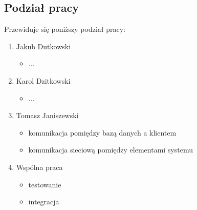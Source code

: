 \documentclass[paper=a4, fontsize=11pt]{scrartcl} %
\numberwithin{equation}{section} %
\numberwithin{figure}{section} %
\numberwithin{table}{section} %
\begin{document}
    \subsection{Podział pracy}
    Przewiduje się poniższy podział pracy:
        \begin{enumerate}
            \item Jakub Dutkowski
                \begin{itemize}
                    \item ...
                \end{itemize}
            \item Karol Dzitkowski
                \begin{itemize}
                    \item ...
                \end{itemize}
            \item Tomasz Janiszewski
                \begin{itemize}
                    \item komunikacja pomiędzy bazą danych a klientem
                    \item komunikacja sieciową pomiędzy elementami systemu
                \end{itemize}
            \item Wspólna praca
                \begin{itemize}
                    \item testowanie
                    \item integracja
                \end{itemize}
        \end{enumerate}
\end{document}
